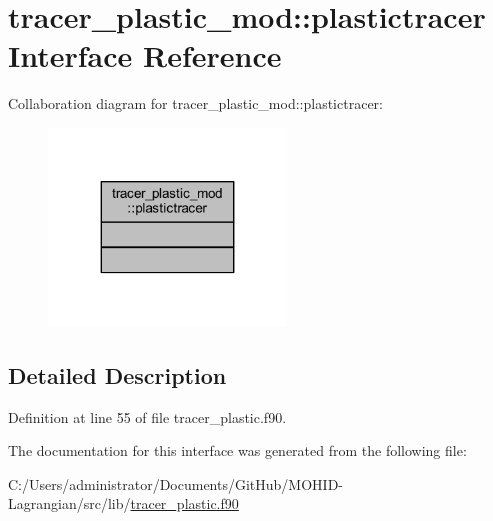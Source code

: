 \hypertarget{interfacetracer__plastic__mod_1_1plastictracer}{}\section{tracer\+\_\+plastic\+\_\+mod\+:\+:plastictracer Interface Reference}
\label{interfacetracer__plastic__mod_1_1plastictracer}


Collaboration diagram for tracer\+\_\+plastic\+\_\+mod\+:\+:plastictracer\+:
\nopagebreak
\begin{figure}[H]
\begin{center}
\leavevmode
\includegraphics[width=179pt]{interfacetracer__plastic__mod_1_1plastictracer__coll__graph}
\end{center}
\end{figure}


\subsection{Detailed Description}


Definition at line 55 of file tracer\+\_\+plastic.\+f90.



The documentation for this interface was generated from the following file\+:\begin{DoxyCompactItemize}
\item 
C\+:/\+Users/administrator/\+Documents/\+Git\+Hub/\+M\+O\+H\+I\+D-\/\+Lagrangian/src/lib/\mbox{\hyperlink{tracer__plastic_8f90}{tracer\+\_\+plastic.\+f90}}\end{DoxyCompactItemize}
